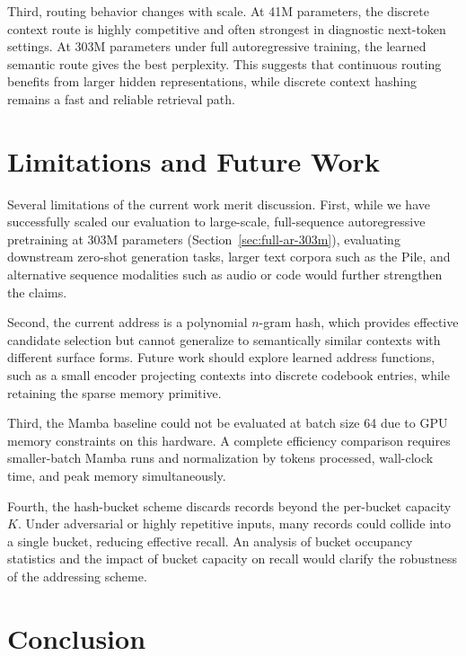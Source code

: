\documentclass{article}
\begin{document}
Third, routing behavior changes with scale. At 41M parameters, the discrete
context route is highly competitive and often strongest in diagnostic
next-token settings. At 303M parameters under full autoregressive training,
the learned semantic route gives the best perplexity. This suggests that
continuous routing benefits from larger hidden representations, while discrete
context hashing remains a fast and reliable retrieval path.

\section{Limitations and Future Work}
\label{sec:limitations}

Several limitations of the current work merit discussion. First, while we have
successfully scaled our evaluation to large-scale, full-sequence autoregressive
pretraining at 303M parameters (Section~\ref{sec:full-ar-303m}), evaluating
downstream zero-shot generation tasks, larger text corpora such as the Pile,
and alternative sequence modalities such as audio or code would further
strengthen the claims.

Second, the current address is a polynomial $n$-gram hash, which provides
effective candidate selection but cannot generalize to semantically similar
contexts with different surface forms. Future work should explore learned
address functions, such as a small encoder projecting contexts into discrete
codebook entries, while retaining the sparse memory primitive.

Third, the Mamba baseline could not be evaluated at batch size 64 due to GPU
memory constraints on this hardware. A complete efficiency comparison requires
smaller-batch Mamba runs and normalization by tokens processed, wall-clock
time, and peak memory simultaneously.

Fourth, the hash-bucket scheme discards records beyond the per-bucket capacity
$K$. Under adversarial or highly repetitive inputs, many records could collide
into a single bucket, reducing effective recall. An analysis of bucket
occupancy statistics and the impact of bucket capacity on recall would
clarify the robustness of the addressing scheme.

\section{Conclusion}
\end{document}
